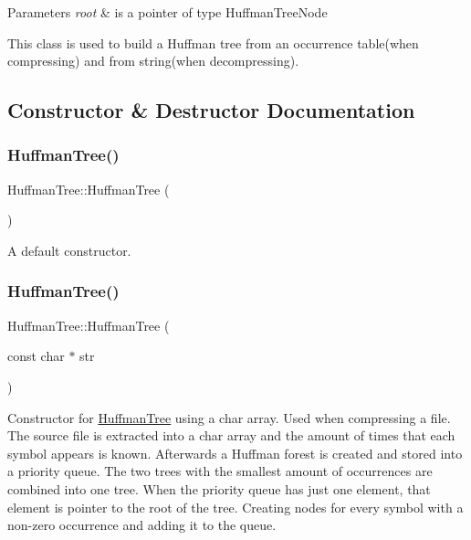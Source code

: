 \begin{DoxyParams}{Parameters}
{\em root} & is a pointer of type Huffman\+Tree\+Node\\
\hline
\end{DoxyParams}
This class is used to build a Huffman tree from an occurrence table(when compressing) and from string(when decompressing). 

\subsection{Constructor \& Destructor Documentation}
\mbox{\label{class_huffman_tree_a69699f7de5cfcd69e741f72ecb2b043d}} 
\subsubsection{\texorpdfstring{Huffman\+Tree()}{HuffmanTree()}\hspace{0.1cm}{\footnotesize\ttfamily [1/4]}}
{\footnotesize\ttfamily Huffman\+Tree\+::\+Huffman\+Tree (\begin{DoxyParamCaption}{ }\end{DoxyParamCaption})}

A default constructor. \mbox{\label{class_huffman_tree_a666b0956e40438a6130f31933271f6c6}} 
\subsubsection{\texorpdfstring{Huffman\+Tree()}{HuffmanTree()}\hspace{0.1cm}{\footnotesize\ttfamily [2/4]}}
{\footnotesize\ttfamily Huffman\+Tree\+::\+Huffman\+Tree (\begin{DoxyParamCaption}\item[{const char $\ast$}]{str }\end{DoxyParamCaption})\hspace{0.3cm}{\ttfamily [explicit]}}

Constructor for \hyperlink{class_huffman_tree}{Huffman\+Tree} using a char array. Used when compressing a file. The source file is extracted into a char array and the amount of times that each symbol appears is known. Afterwards a Huffman forest is created and stored into a priority queue. The two trees with the smallest amount of occurrences are combined into one tree. When the priority queue has just one element, that element is pointer to the root of the tree. Creating nodes for every symbol with a non-\/zero occurrence and adding it to the queue.\mbox{\label{class_huffman_tree_a610ac7959bfcf17c8a3c02cd9280ef61}} 
